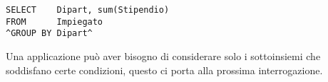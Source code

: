 \begin{lstlisting}
SELECT    Dipart, sum(Stipendio)
FROM      Impiegato
^GROUP BY Dipart^
\end{lstlisting}

Una applicazione può aver bisogno di considerare solo i sottoinsiemi che soddisfano certe condizioni, questo ci porta alla prossima interrogazione.
